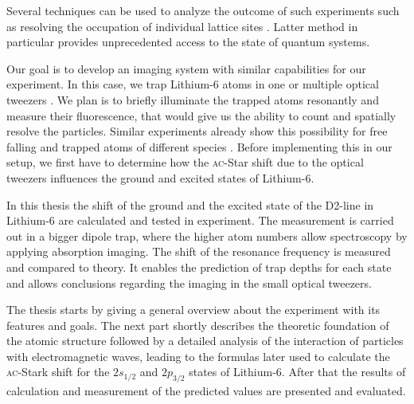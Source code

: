 Several techniques can be used to analyze the outcome of such experiments \cite{ketterle} such as resolving the occupation of individual lattice sites \cite{greiner2, bloch2,greiner3,kuhr}. Latter method in particular provides unprecedented access to the state of quantum systems.

Our goal is to develop an imaging system with similar capabilities for our experiment. In this case, we trap Lithium-6 atoms in one or multiple optical tweezers \cite{doublewell}. We plan is to briefly illuminate the trapped atoms resonantly and measure their fluorescence, that would give us the ability to count and spatially resolve the particles. Similar experiments already show this possibility for free falling and trapped atoms of different species \cite{schmiedmayer,andersen}. Before implementing this in our setup, we first have to determine how the \textsc{ac}-Star shift due to the optical tweezers influences the ground and excited states of Lithium-6.

%

In this thesis the shift of the ground and the excited state of the D2-line in Lithium-6 are calculated and tested in experiment. The measurement is carried out in a bigger dipole trap, where the higher atom numbers allow spectroscopy by applying absorption imaging. The shift of the resonance frequency is measured and compared to theory. It enables the prediction of trap depths for each state and allows conclusions regarding the imaging in the small optical tweezers. 

The thesis starts by giving a general overview about the experiment with its features and goals. The next part shortly describes the theoretic foundation of the atomic structure followed by a detailed analysis of the interaction of particles with electromagnetic waves, leading to the formulas later used to calculate the \textsc{ac}-Stark shift for the $2s_{1/2}$ and $2p_{3/2}$ states of Lithium-6. After that the results of calculation and measurement of the predicted values are presented and evaluated.

